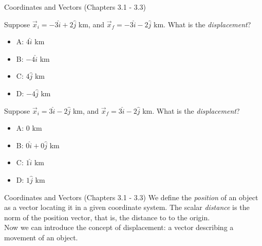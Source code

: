 \documentclass{beamer}
\begin{document}
\begin{frame}{Coordinates and Vectors (Chapters 3.1 - 3.3)}
\small
\begin{minipage}[b]{0.45\linewidth}
Suppose $\vec{x}_i = -3\hat{i} + 2\hat{j}$ km, and $\vec{x}_f = -3\hat{i} - 2\hat{j}$ km.  What is the \textit{displacement}?
\vspace{0.2cm}
\begin{itemize}
\item A: $4\hat{i}$ km
\item B: $-4\hat{i}$ km
\item C: $4\hat{j}$ km
\item D: $-4\hat{j}$ km
\end{itemize}
\end{minipage}
\hspace{0.5cm}
\begin{minipage}[b]{0.45\linewidth}
Suppose $\vec{x}_i = 3\hat{i} - 2\hat{j}$ km, and $\vec{x}_f = 3\hat{i} - 2\hat{j}$ km.  What is the \textit{displacement}?
\vspace{0.2cm}
\begin{itemize}
\item A: 0 km
\item B: $0\hat{i} + 0\hat{j}$ km
\item C: $1\hat{i}$ km
\item D: $1\hat{j}$ km
\end{itemize}
\end{minipage}
\end{frame}

\begin{frame}{Coordinates and Vectors (Chapters 3.1 - 3.3)}
We define the \textit{position} of an object as a vector locating it in a given coordinate system.  The scalar \textit{distance} is the norm of the position vector, that is, the distance to to the origin. \\
\vspace{0.5cm}
Now we can introduce the concept of \alert{displacement}: a vector describing a movement of an object.
\end{frame}
\end{document}

